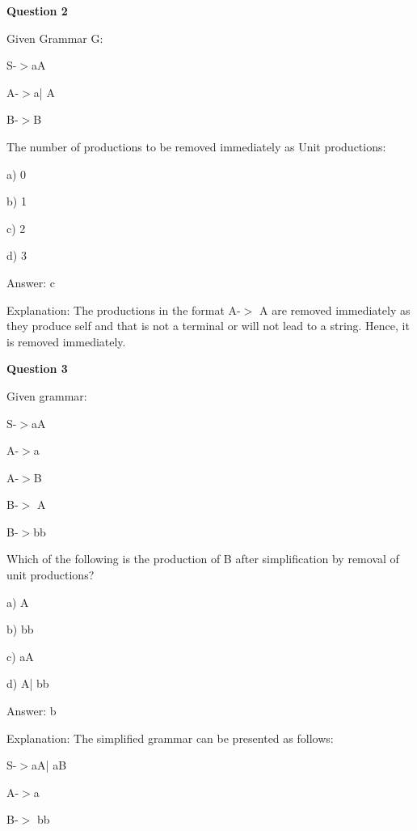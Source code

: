 \documentclass{article}
\begin{document}
\begin{mdframed}[linewidth=1pt, roundcorner=5pt, linecolor=gray!30, backgroundcolor=gray!5]
\textbf{Question 2} 

Given Grammar G:

S-$>$aA

A-$>$a| A

B-$>$B

The number of productions to be removed immediately as Unit productions:

a) 0

b) 1

c) 2

d) 3
\vspace{5pt} \par
\begin{tcolorbox}[colback=green!5, colframe=green!40!black, title=Solution]
Answer: c

Explanation: The productions in the format A-$>$ A are removed immediately as they produce self and that is not a terminal or will not lead to a string. Hence, it is removed immediately.
\end{tcolorbox}
\end{mdframed}
\newpage

\begin{mdframed}[linewidth=1pt, roundcorner=5pt, linecolor=gray!30, backgroundcolor=gray!5]
\textbf{Question 3} 

Given grammar:

S-$>$aA

A-$>$a

A-$>$B

B-$>$ A

B-$>$bb

Which of the following is the production of B after simplification by removal of unit productions?

a) A

b) bb

c) aA

d) A| bb
\vspace{5pt} \par
\begin{tcolorbox}[colback=green!5, colframe=green!40!black, title=Solution]
Answer: b

Explanation: The simplified grammar can be presented as follows:

S-$>$aA| aB

A-$>$a

B-$>$ bb
\end{tcolorbox}
\end{mdframed}
\end{document}
